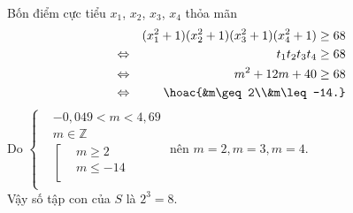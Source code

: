 \begin{ex}
{\begin{eqnarray*}
		\end{eqnarray*}
		Bốn điểm cực tiểu $x_1$, $x_2$, $x_3$, $x_4$ thỏa mãn
		\allowdisplaybreaks
		\begin{eqnarray*}
			&&(x_1^2+1)(x_2^2+1)(x_3^2+1)(x_4^2+1)\geq 68\\
			&\Leftrightarrow&t_1t_2t_3t_4\ge 68\\
			&\Leftrightarrow&m^2+12m+40\geq 68\\
			&\Leftrightarrow&\hoac{&m\geq 2\\&m\leq -14.}
		\end{eqnarray*}
		Do $\left\{\begin{aligned}
			&-0{,}049<m<4{,}69\\ 
			& m\in\mathbb{Z}\\ 
			&\left[\begin{aligned}
				& m\ge 2\\ 
				& m\le-14\\ 
			\end{aligned}\right.\\ 
		\end{aligned}\right.$ nên $m=2,m=3,m=4$.\\
		Vậy số tập con của $S$ là $2^3=8$.
	}
\end{ex}

